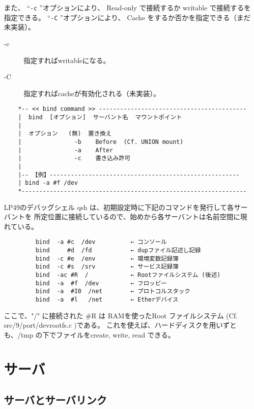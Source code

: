    また、 ``\verb|-c| ''オプションにより、
   Read-only で接続するか writable で接続するを指定できる。
   ``\verb|-C| ''オプションにより、
   Cache をするか否かを指定できる（まだ未実装）。

   \begin{description}
   \item[-c]  指定すればwritableになる。
   \item[-C]  指定すればcacheが有効化される（未実装）。
   \end{description}

\begin{verbatim}
    *-- << bind command >> ------------------------------------------             
    |  bind  [オプション]  サーバント名  マウントポイント  
    |
    |  オプション   (無)  置き換え                                
    |               -b    Before  (Cf. UNION mount)  
    |               -a    After                                   
    |               -c    書き込み許可  
    |
    |-- 【例】------------------------------------------------------
    | bind -a #f /dev                      
    *----------------------------------------------------------------
\end{verbatim}

      LP49のデバッグシェル qsh は、初期設定時に下記のコマンドを発行して各サーバントを
      所定位置に接続しているので、始めから各サーバントは名前空間に現れている。

\begin{verbatim} 
         bind  -a #c  /dev          ← コンソール 
         bind     #d  /fd           ← dupファイル記述し記録 
         bind  -c #e  /env          ← 環境変数記録簿
         bind  -c #s  /srv          ← サービス記録簿
         bind  -ac #R  /            ← Rootファイルシステム (後述)
         bind  -a  #f  /dev         ← フロッピー 
         bind  -a  #I0  /net        ← プロトコルスタック
         bind  -a  #l   /net        ← Etherデバイス
\end{verbatim}

      ここで、"/" に接続された \#R は RAMを使ったRoot ファイルシステム 
      (Cf. src/9/port/devrootfs.c )である。
      これを使えば、ハードディスクを用いずとも、/tmp の下でファイルをcreate, write, read できる。


\chapter{サーバ}
\section{サーバとサーバリンク}


